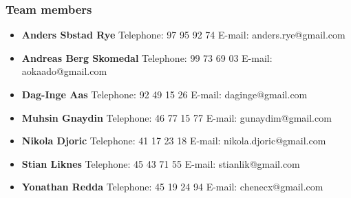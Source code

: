		\subsubsection{Team members}
				\begin{itemize}
					\item {\bf Anders Sbstad Rye} \newline
							Telephone: 97 95 92 74 \newline
							E-mail: anders.rye@gmail.com
					\item {\bf Andreas Berg Skomedal} \newline
							Telephone: 99 73 69 03 \newline
							E-mail: aokaado@gmail.com
					\item {\bf Dag-Inge Aas} \newline
							Telephone: 92 49 15 26 \newline
							E-mail: daginge@gmail.com
					\item {\bf Muhsin Gnaydin} \newline
							Telephone: 46 77 15 77 \newline
							E-mail: gunaydim@gmail.com
					\item {\bf Nikola Djoric} \newline
							Telephone: 41 17 23 18 \newline
							E-mail: nikola.djoric@gmail.com
					\item {\bf Stian Liknes} \newline
							Telephone: 45 43 71 55 \newline
							E-mail: stianlik@gmail.com
					\item {\bf Yonathan Redda} \newline
							Telephone: 45 19 24 94 \newline
							E-mail: chenecx@gmail.com
				\end{itemize}
				
